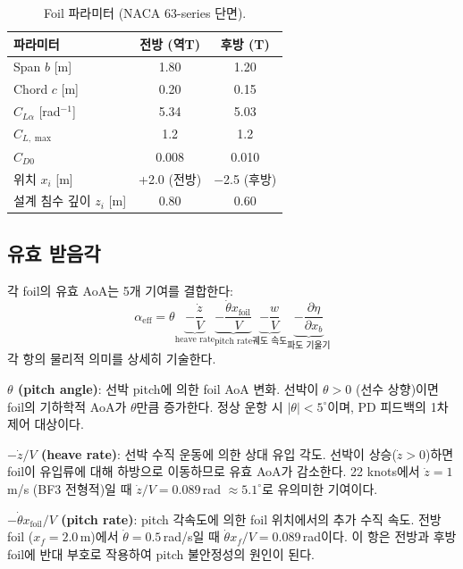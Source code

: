 \documentclass[11pt]{report}
\numberwithin{equation}{chapter}
\numberwithin{figure}{chapter}
\numberwithin{table}{chapter}
\begin{document}
\begin{table}[htbp]
\centering
\caption{Foil 파라미터 (NACA 63-series 단면).}
\label{tab:foil_params}
\begin{tabular}{lcc}
\toprule
파라미터 & 전방 (역T) & 후방 (T) \\
\midrule
Span $b$ [m]            & 1.80 & 1.20 \\
Chord $c$ [m]           & 0.20 & 0.15 \\
$C_{L\alpha}$ [rad$^{-1}$] & 5.34 & 5.03 \\
$C_{L,\max}$            & 1.2  & 1.2  \\
$C_{D0}$                & 0.008 & 0.010 \\
위치 $x_i$ [m]      & +2.0 (전방) & $-$2.5 (후방) \\
설계 침수 깊이 $z_i$ [m]  & 0.80 & 0.60 \\
\bottomrule
\end{tabular}
\end{table}

\subsection{유효 받음각}

각 foil의 유효 AoA는 5개 기여를 결합한다:
\begin{equation}
  \alpha_{\text{eff}} = \theta
    \underbrace{- \frac{\dot{z}}{V}}_{\text{heave rate}}
    \underbrace{- \frac{\dot{\theta} x_{\text{foil}}}{V}}_{\text{pitch rate}}
    \underbrace{- \frac{w}{V}}_{\text{궤도 속도}}
    \underbrace{- \frac{\partial \eta}{\partial x_b}}_{\text{파도 기울기}}
  \label{eq:alpha_eff}
\end{equation}
각 항의 물리적 의미를 상세히 기술한다.

\textbf{$\theta$ (pitch angle)}: 선박 pitch에 의한 foil AoA 변화.
선박이 $\theta > 0$ (선수 상향)이면 foil의 기하학적 AoA가 $\theta$만큼 증가한다.
정상 운항 시 $|\theta| < 5^\circ$이며, PD 피드백의 1차 제어 대상이다.

\textbf{$-\dot{z}/V$ (heave rate)}: 선박 수직 운동에 의한 상대 유입 각도.
선박이 상승($\dot{z} > 0$)하면 foil이 유입류에 대해 하방으로 이동하므로
유효 AoA가 감소한다. 22 knots에서 $\dot{z} = 1$\,m/s (BF3 전형적)일 때
$\dot{z}/V = 0.089$\,rad $\approx 5.1^\circ$로 유의미한 기여이다.

\textbf{$-\dot{\theta}x_{\text{foil}}/V$ (pitch rate)}: pitch 각속도에 의한
foil 위치에서의 추가 수직 속도. 전방 foil ($x_f = 2.0$\,m)에서
$\dot{\theta} = 0.5$\,rad/s일 때 $\dot{\theta}x_f/V = 0.089$\,rad이다.
이 항은 전방과 후방 foil에 반대 부호로 작용하여
pitch 불안정성의 원인이 된다.
\end{document}
